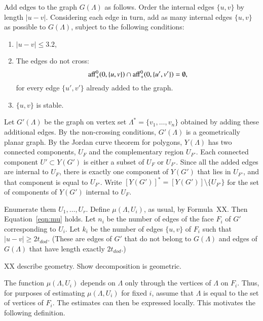 Add edges to the graph $G(\Lambda)$ 
as follows.  
Order the internal edges $\{u,v\}$ by length $|u-v|$.  Considering each
edge in turn,
add as many internal edges $\{u,v\}$ as possible to $G(\Lambda)$, subject
to the following conditions:
\begin{enumerate}
\item  $|u-v|\le3.2$, 
\item The edges do not cross:
  $$%
  \op{aff}_+^0(0,\{u,v\}) \cap \op{aff}_+^0(0,\{u',v'\}) = \emptyset,
  $$%
for every  edge $\{u',v'\}$ already added to the graph.
\item  $\{u,v\}$ is stable.
\end{enumerate}  

Let $G'(\Lambda)$ be the graph on vertex set $\Lambda^*=\{v_1,\ldots,v_n\}$ obtained by adding these  additional edges.  By the non-crossing
conditions, $G'(\Lambda)$ is a geometrically planar graph.  
By the Jordan curve theorem for polygons, $Y(\Lambda)$ has two connected 
components,
$U_F$ and the complementary region $U_{F'}$.
Each
connected component $U'\subset Y(G')$ is either a subset of $U_F$ or $U_{F'}$.
Since all the added edges are internal to $U_F$, there is exactly
one component of $Y(G')$ that lies in $U_{F'}$, and that component
is equal to $U_{F'}$.  Write $[Y(G')]^* = [Y(G')]\setminus\{U_{F'}\}$
for the set of components of $Y(G')$ internal to $U_F$.

Enumerate them $U_1,\ldots,U_r$.  Define
$\mu(\Lambda,U_i)$, as usual,  by Formula~XX.  Then
Equation~\ref{eqn:mu} holds.  Let $n_i$ be the number of edges of the face
$F_i$ of $G'$ corresponding to $U_i$.  Let $k_i$ be the number of edges
$\{u,v\}$
of $F_i$ such that $|u-v|\ge 2t_{dod}$. (These are edges of $G'$ that do not
belong to $G(\Lambda)$ and edges of $G(\Lambda)$ that have
length exactly $2t_{dod}$.)  

XX describe geometry. Show decomposition is geometric.

The function $\mu(\Lambda,U_i)$ depends on $\Lambda$ only through
the vertices of $\Lambda$ on $F_i$.  Thus, for purposes of estimating
$\mu(\Lambda,U_i)$ for fixed $i$,  assume that $\Lambda$
is equal to the set of vertices of $F_i$.  The estimates can then
be expressed locally.
   This motivates the following definition.

